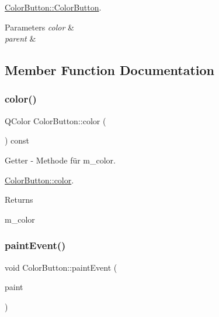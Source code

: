 \hyperlink{class_color_button_a128b21900f22efdc9d71d0bffa0b64f8}{Color\+Button\+::\+Color\+Button}. 


\begin{DoxyParams}{Parameters}
{\em color} & \\
\hline
{\em parent} & \\
\hline
\end{DoxyParams}


\subsection{Member Function Documentation}
\mbox{\label{class_color_button_a7583a20c9a126ba93e344ea728c19954}} 
\subsubsection{\texorpdfstring{color()}{color()}}
{\footnotesize\ttfamily Q\+Color Color\+Button\+::color (\begin{DoxyParamCaption}{ }\end{DoxyParamCaption}) const}



Getter -\/ Methode für m\+\_\+color. 

\hyperlink{class_color_button_a7583a20c9a126ba93e344ea728c19954}{Color\+Button\+::color}.

\begin{DoxyReturn}{Returns}


m\+\_\+color 
\end{DoxyReturn}
\mbox{\label{class_color_button_ae7b2847c9974fb52f80d54dafc7a0f00}} 
\subsubsection{\texorpdfstring{paint\+Event()}{paintEvent()}}
{\footnotesize\ttfamily void Color\+Button\+::paint\+Event (\begin{DoxyParamCaption}\item[{Q\+Paint\+Event $\ast$}]{paint }\end{DoxyParamCaption})}



